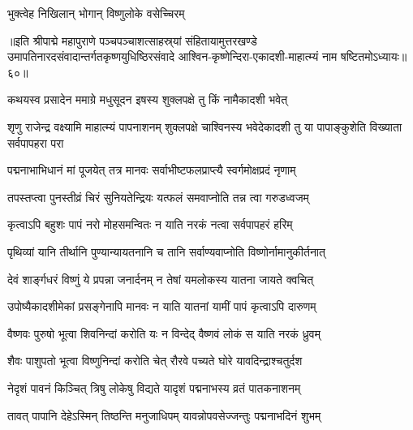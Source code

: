 \onelineshloka
{भुक्त्वेह निखिलान् भोगान् विष्णुलोके वसेच्चिरम्}%

॥इति श्रीपाद्मे महापुराणे पञ्चपञ्चाशत्साहस्र्यां संहितायामुत्तरखण्डे उमापतिनारदसंवादान्तर्गतकृष्णयुधिष्ठिरसंवादे आश्विन-कृष्णेन्दिरा-एकादशी-माहात्म्यं नाम षष्टितमोऽध्यायः॥६०॥

\genMangalaShloka

\hyperref[sec:ekadashi_mahatmyam_padma_puranam]{\closesub}
\clearpage

\label{sec:padma-ashvina-shukla-pashankusha}

\ganapatyadiDhyanam
\padmaPuranam



\twolineshloka
{कथयस्व प्रसादेन ममाग्रे मधुसूदन}
{इषस्य शुक्लपक्षे तु किं नामैकादशी भवेत्}%


\threelineshloka
{शृणु राजेन्द्र वक्ष्यामि माहात्म्यं पापनाशनम्}
{शुक्लपक्षे चाश्विनस्य भवेदेकादशी तु या}%
{पापाङ्कुशेति विख्याता सर्वपापहरा परा}

\twolineshloka
{पद्मनाभाभिधानं मां पूजयेत् तत्र मानवः}%
{सर्वाभीष्टफलप्राप्त्यै स्वर्गमोक्षप्रदं नृणाम्}

\twolineshloka
{तपस्तप्त्वा पुनस्तीव्रं चिरं सुनियतेन्द्रियः}%
{यत्फलं समवाप्नोति तन्न त्वा गरुडध्वजम्}

\twolineshloka
{कृत्वाऽपि बहुशः पापं नरो मोहसमन्वितः}%
{न याति नरकं नत्वा सर्वपापहरं हरिम्}

\twolineshloka
{पृथिव्यां यानि तीर्थानि पुण्यान्यायतनानि च}%
{तानि सर्वाण्यवाप्नोति विष्णोर्नामानुकीर्तनात्}

\twolineshloka
{देवं शार्ङ्गधरं विष्णुं ये प्रपन्ना जनार्दनम्}%
{न तेषां यमलोकस्य यातना जायते क्वचित्}

\threelineshloka
{उपोष्यैकादशीमेकां प्रसङ्गेनापि मानवः}
{न याति यातनां यामीं पापं कृत्वाऽपि दारुणम्}%

\twolineshloka
{वैष्णवः पुरुषो भूत्वा शिवनिन्दां करोति यः}
{न विन्देद् वैष्णवं लोकं स याति नरकं ध्रुवम्}%

\twolineshloka
{शैवः पाशुपतो भूत्वा विष्णुनिन्दां करोति चेत्}
{रौरवे पच्यते घोरे यावदिन्द्राश्चतुर्दश}%

\twolineshloka
{नेदृशं पावनं किञ्चित् त्रिषु लोकेषु विद्यते}
{यादृशं पद्मनाभस्य व्रतं पातकनाशनम्}%

\twolineshloka
{तावत् पापानि देहेऽस्मिन् तिष्ठन्ति मनुजाधिपम्}
{यावन्नोपवसेज्जन्तुः पद्मनाभदिनं शुभम्}%

